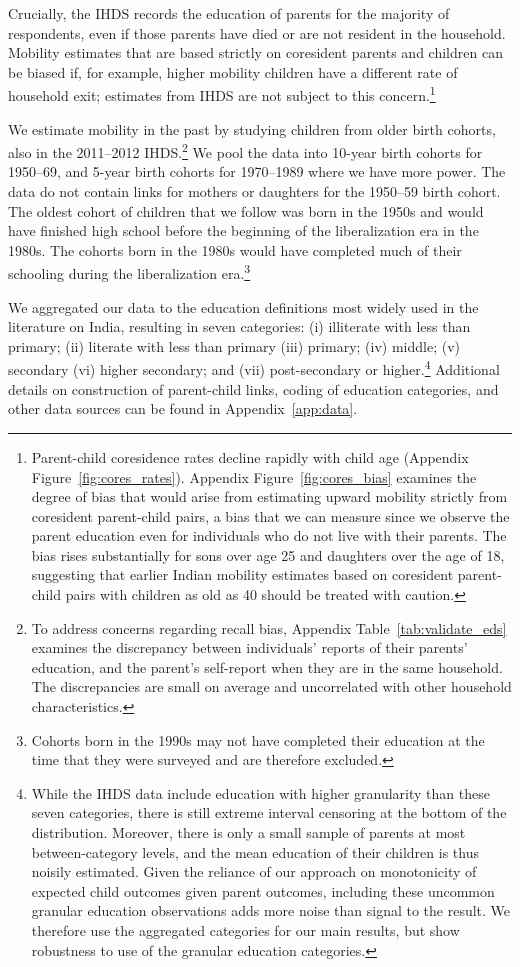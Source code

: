 \documentclass[12pt,letterpaper]{article}
\numberwithin{equation}{section}
\begin{document}
Crucially, the IHDS records the education of parents for the majority of respondents, even if those parents have died or are not resident in the household. Mobility estimates that are based strictly on coresident parents and children can be biased if, for example, higher mobility children have a different rate of household exit; estimates from IHDS are not subject to this concern.\footnote{Parent-child coresidence rates decline rapidly with child age (Appendix Figure~\ref{fig:cores_rates}). Appendix Figure~\ref{fig:cores_bias} examines the degree of bias that would arise from estimating upward mobility strictly from coresident parent-child pairs, a bias that we can measure since we observe the parent education even for individuals who do not live with their parents. The bias rises substantially for sons over age 25 and daughters over the age of 18, suggesting that earlier Indian mobility estimates based on coresident parent-child pairs with children as old as 40 should be treated with caution.}

We estimate mobility in the past by studying children from older birth cohorts, also in the 2011--2012 IHDS.\footnote{To address concerns regarding recall bias, Appendix Table~\ref{tab:validate_eds} examines the discrepancy between individuals' reports of their parents' education, and the parent's self-report when they are in the same household. The discrepancies are small on average and uncorrelated with other household characteristics.}  We pool the data into 10-year birth cohorts for 1950--69, and 5-year birth cohorts for 1970--1989 where we have more power. The data do not contain links for mothers or daughters for the 1950--59 birth cohort. The oldest cohort of children that we follow was born in the 1950s and would have finished high school before the beginning of the liberalization era in the 1980s. The cohorts born in the 1980s would have completed much of their schooling during the liberalization era.\footnote{Cohorts born in the 1990s may not have completed their education at the time that they were surveyed and are therefore excluded.}

We aggregated our data to the education definitions most widely used in the literature on India, resulting in seven categories: (i) illiterate with less than primary; (ii) literate with less than primary (iii) primary; (iv) middle; (v) secondary (vi) higher secondary; and (vii) post-secondary or higher.\footnote{While the IHDS data include education with higher granularity than these seven categories, there is still extreme interval censoring at the bottom of the distribution. Moreover, there is only a small sample of parents at most between-category levels, and the mean education of their children is thus noisily estimated. Given the reliance of our approach on monotonicity of expected child outcomes given parent outcomes, including these uncommon granular education observations adds more noise than signal to the result. We therefore use the aggregated categories for our main results, but show robustness to use of the granular education categories.} Additional details on construction of parent-child links, coding of education categories, and other data sources can be found in Appendix~\ref{app:data}.
\end{document}
